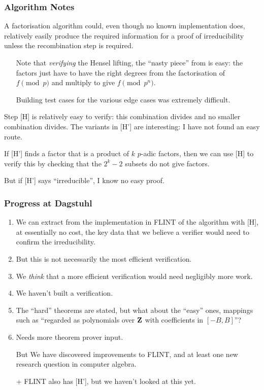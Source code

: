 \documentclass[handout]{beamer}   %
\begin{document}
\begin{frame}[fragile]
\frametitle{Algorithm Notes}
A factorisation algorithm could, even though no known implementation does, relatively easily produce the required information for a proof of irreducibility unless the recombination step is required. \pause
\begin{enumerate}[<+->]
\item[Note]that \emph{verifying} the Hensel lifting, the ``nasty piece'' from \cite{MooreNorman1981} is easy: the factors just have to have the right degrees from the factorisation of $f \pmod p$ and multiply to give $f\pmod{p^n}$.
\item[\dbend]Building test cases for the various edge cases was extremely difficult.
\end{enumerate}
\pause
Step [H] is relatively easy to verify: this combination divides and no smaller combination divides. \pause The variants in [H'] are interesting: I have not found an easy route. \par\pause
If [H'] finds a factor that is a product of $k$ $p$-adic factors, then we can use [H] to verify this by checking that the $2^k-2$ subsets do not give factors.
\par\pause
But if [H'] says ``irreducible'', I know no easy proof.
\end{frame}
\begin{frame}[fragile]
\frametitle{Progress at Dagstuhl}
\pause
\begin{enumerate}[<+->]
\item
We can extract from the implementation in FLINT \cite{Flint2023a} of the algorithm with [H], at essentially no cost, the key data that we believe a verifier would need to confirm the irreducibility.
\item But this is not necessarily the most efficient verification.
\item We \emph{think} that a more efficient verification would need negligibly more work.
\item We haven't built a verification.
\item The ``hard'' theorems are stated, but what about the ``easy'' ones, mappings such as ``regarded as polynomials over ${\bf Z}$ with coefficients in $[-B,B]$''?
\item Needs more theorem prover input.
\item[But]We have discovered improvements to FLINT, and at least one new research question in computer algebra.
\item[+]FLINT also has [H'], but we haven't looked at this yet.
\end{enumerate}
\end{frame}
\end{document}
